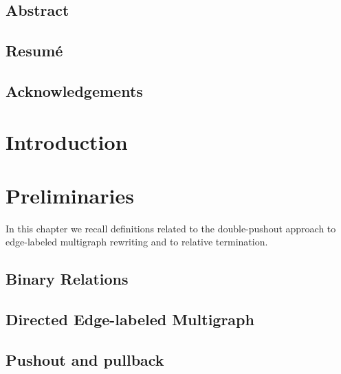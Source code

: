 \documentclass{report}
\begin{document}
  
   
  
 
\newpage
\section*{Abstract}

 
\newpage  
\section*{Resumé}
  
 
\newpage  
\section*{Acknowledgements} 

\newpage       
 
  
\tableofcontents   
\newpage      

\chapter{Introduction}  


\chapter{Preliminaries}
\label{chap:preliminaries}
In this chapter we recall definitions related to the double-pushout approach to edge-labeled multigraph rewriting and to relative termination. 
\section{Binary Relations}
\label{Preliminaries:BinaryRelations}

\section{Directed Edge-labeled Multigraph} 
\label{Preliminaries:Graphs}
 
\section{Pushout and pullback}  
\label{Preliminaries:Pushout}

\end{document}
